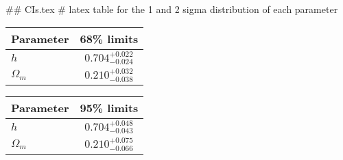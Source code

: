 ## CIs.tex
# latex table for the 1 and 2 sigma distribution of each parameter

\begin{tabular} { l  c}
 Parameter &  68\% limits\\
\hline
{\boldmath$h              $} & $0.704^{+0.022}_{-0.024}   $\\
{\boldmath$\Omega_m       $} & $0.210^{+0.032}_{-0.038}   $\\
\hline
\end{tabular}

\begin{tabular} { l  c}
 Parameter &  95\% limits\\
\hline
{\boldmath$h              $} & $0.704^{+0.048}_{-0.043}   $\\
{\boldmath$\Omega_m       $} & $0.210^{+0.075}_{-0.066}   $\\
\hline
\end{tabular}
